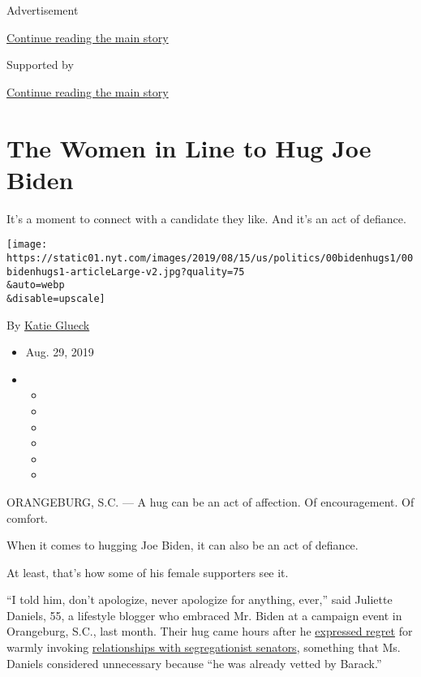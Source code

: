 Advertisement

\protect\hyperlink{after-top}{Continue reading the main story}

Supported by

\protect\hyperlink{after-sponsor}{Continue reading the main story}

\hypertarget{the-women-in-line-to-hug-joe-biden}{%
\section{The Women in Line to Hug Joe
Biden}\label{the-women-in-line-to-hug-joe-biden}}

It's a moment to connect with a candidate they like. And it's an act of
defiance.

\texttt{[image: https://static01.nyt.com/images/2019/08/15/us/politics/00bidenhugs1/00bidenhugs1-articleLarge-v2.jpg?quality=75\\\&auto=webp\\\&disable=upscale]}

By \href{https://www.nytimes.com/by/katie-glueck}{Katie Glueck}

\begin{itemize}
\item
  Aug. 29, 2019
\item
  \begin{itemize}
  \item
  \item
  \item
  \item
  \item
  \item
  \end{itemize}
\end{itemize}

ORANGEBURG, S.C. --- A hug can be an act of affection. Of encouragement.
Of comfort.

When it comes to hugging Joe Biden, it can also be an act of defiance.

At least, that's how some of his female supporters see it.

``I told him, don't apologize, never apologize for anything, ever,''
said Juliette Daniels, 55, a lifestyle blogger who embraced Mr. Biden at
a campaign event in Orangeburg, S.C., last month. Their hug came hours
after he
\href{https://www.nytimes.com/2019/07/06/us/politics/joe-biden-barack-obama-south-carolina.html?action=click\&module=Top\%20Stories\&pgtype=Homepage}{expressed
regret} for warmly invoking
\href{https://www.nytimes.com/2019/06/19/us/politics/biden-segregationists.html}{relationships
with segregationist senators}, something that Ms. Daniels considered
unnecessary because ``he was already vetted by Barack.''

